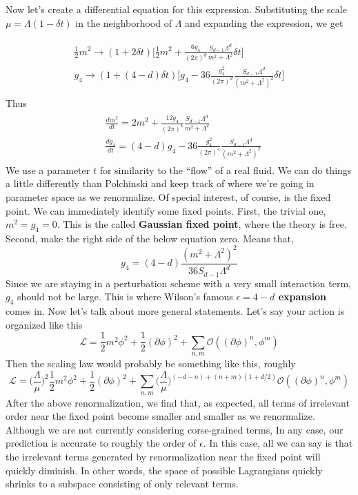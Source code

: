 \documentclass[12pt,halfline,a4paper]{ouparticle}
\begin{document}
Now let's create a differential equation for this expression. Substituting the scale $\mu = \Lambda(1-\delta t)$ in the neighborhood of $\Lambda$ and expanding the expression, we get

\begin{align}
	\begin{split}
		\frac{1}{2}m^2\rightarrow(1+2\delta t)\bigg[\frac{1}{2} m^2+\frac{6g_4}{(2\pi)^d}\frac{S_{d-1}\Lambda^{d}}{m^2+\Lambda^2}\delta t\bigg]\\
		g_4\rightarrow(1+(4-d)\delta t)\bigg[g_4-36\frac{g_4^2}{(2\pi)^d} \frac{S_{d-1}\Lambda^{d}}{(m^2+\Lambda^2)^2}\delta t\bigg]\\
	\end{split}	
\end{align}
Thus
\begin{align}
	\begin{split}
&\frac{dm^2}{dt}=2m^2+\frac{12g_4}{(2\pi)^4}\frac{S_{d-1}\Lambda^{d}}{m^2+\Lambda^2}\\
&\frac{dg_4}{dt}=(4-d)g_4-36\frac{g_4^2}{(2\pi)^4}\frac{S_{d-1}\Lambda^{d}}{(m^2+\Lambda^2)^2}
	\end{split}	
\end{align}
We use a parameter $t$ for similarity to the “flow” of a real fluid. We can do things a little differently than Polchinski and keep track of where we're going in parameter space as we renormalize. Of special interest, of course, is the fixed point.
We can immediately identify some fixed points.
First, the trivial one, $m^2=g_4=0$. This is the called \textbf{Gaussian fixed point}, where the theory is free.
Second, make the right side of the below equation zero. Means that,
\begin{equation}
	\label{eq:epsilonexpansion}
	g_4=(4-d)\frac{(m^2+\Lambda^2)^2}{36S_{d-1}\Lambda^d}
\end{equation}
Since we are staying in a perturbation scheme with a very small interaction term, $g_4$ should not be large.  This is where Wilson's famous \textbf{$\epsilon=4-d$ expansion} comes in.
Now let's talk about more general statements. Let's say your action is organized like this
\begin{equation}
	\mathcal L = \frac{1}{2}m^2\phi^2 + \frac{1}{2}(\partial\phi)^2 +\sum_{n,m}\mathcal O((\partial \phi)^n,\phi^m)
\end{equation}
Then the scaling law would probably be something like this, roughly 
\begin{equation}
	\mathcal L = \bigg(\frac{\Lambda}{\mu}\bigg)^2\frac{1}{2}m^2\phi^2 +\frac{1}{2}(\partial\phi)^2 +\sum_{n,m}\bigg(\frac{\Lambda}{\mu}\bigg)^{(-d-n)+(n+m)(1+d/2)}\mathcal O((\partial \phi)^n,\phi^m)
\end{equation}
After the above renormalization, we find that, as expected, all terms of irrelevant order near the fixed point become smaller and smaller as we renormalize. Although we are not currently considering corse-grained terms,
In any case, our prediction is accurate to roughly the order of $\epsilon$. In this case, all we can say is that the irrelevant terms generated by renormalization near the fixed point will quickly diminish.
In other words, the space of possible Lagrangians quickly shrinks to a subspace consisting of only relevant terms.
\end{document}
